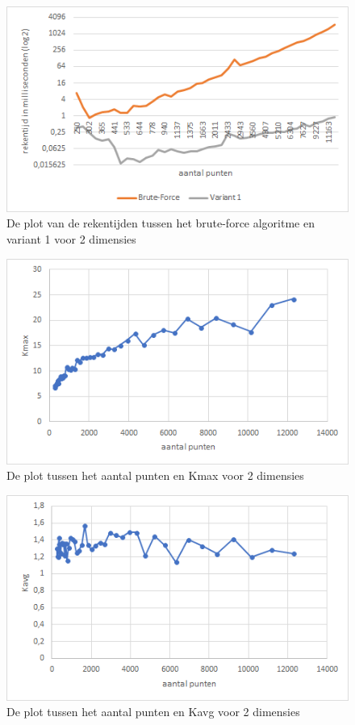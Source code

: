 \documentclass[12pt]{article}
\begin{document}
\newpage

\begin{figure}
\includegraphics[width=\textwidth]{Simpel-var1-rekentijd.png}
\caption{De plot van de rekentijden tussen het brute-force algoritme en variant 1 voor 2 dimensies}
\end{figure}

\begin{figure}
\includegraphics[width=\textwidth]{punten-Kmax.png}
\caption{De plot tussen het aantal punten en Kmax voor 2 dimensies}
\end{figure}

\begin{figure}
\includegraphics[width=\textwidth]{punten-Kavg}
\caption{De plot tussen het aantal punten en Kavg voor 2 dimensies}
\end{figure}
\end{document}
